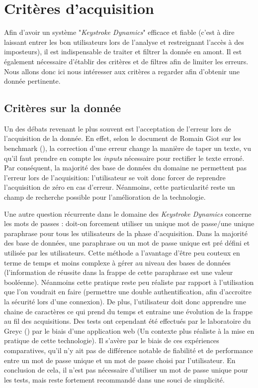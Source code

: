
\section{Critères d'acquisition }

Afin d'avoir un système "\textit{Keystroke Dynamics}" efficace et fiable (c'est à dire laissant entrer les bon utilisateurs lors de l'analyse et restreignant l'accès à des imposteurs), il est indispensable de traiter et filtrer la donnée en amont. Il est également nécessaire d'établir des critères et de filtres afin de  limiter les erreurs. Nous allons donc ici nous intéresser aux critères a regarder afin d'obtenir une donnée pertinente.

\subsection{Critères sur la donnée}

Un des débats revenant le plus souvent est l'acceptation de l'erreur lors de l'acquisition de la donnée. En effet, selon le document de Romain Giot sur les benchmark (\cite{giotBenchmark}), la correction d'une erreur change la manière de taper un texte, vu qu'il faut  prendre en compte les \textit{inputs} nécessaire pour rectifier le texte erroné. Par conséquent, la majorité des base de données du domaine ne permettent pas l'erreur lors de l'acquisition: l'utilisateur se voit donc forcer de reprendre l'acquisition de zéro en cas d'erreur. Néanmoins, cette particularité reste un champ de recherche possible pour l'amélioration de la technologie.

Une autre question récurrente dans le domaine des \textit{Keystroke Dynamics} concerne les mots de passes : doit-on forcement utiliser un unique mot de passe/une unique paraphrase pour tous les utilisateurs de la phase d'acquisition. Dans la majorité des base de données, une paraphrase ou un mot de passe unique est pré défini et utilisée par les utilisateurs. Cette méthode a l'avantage d'être peu couteux en terme de temps et moins complexe à gérer au niveau des bases de données (l'information de réussite dans la frappe de cette paraphrase est une valeur booléenne). Néanmoins cette pratique reste peu réaliste par rapport à l'utilisation que l'on voudrait en faire (permettre une double authentification, afin d'accroitre la sécurité lors d'une connexion). De plus, l'utilisateur doit donc apprendre une chaine de caractères ce qui prend du temps et entraine une évolution de la frappe au fil des acquisitions.
Des tests ont cependant été effectués par le laboratoire du Greyc (\cite{giotWeb}) par le biais d'une application web (Un contexte plus réaliste à la mise en pratique de cette technologie). Il s'avère par le biais de ces expériences comparatives, qu'il n'y ait pas de différence notable de fiabilité et de performance entre un mot de passe unique et un mot de passe choisi par l'utilisateur.
En conclusion de cela, il n'est pas nécessaire d'utiliser un mot de passe unique pour les tests, mais reste fortement recommandé dans une souci de simplicité.

